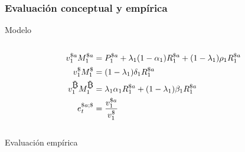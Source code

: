 \begin{frame}[t]
\frametitle{Evaluación conceptual y empírica}
    
    \begin{block}{Modelo}
        \vspace{-10pt}
        \begin{column}{0.4\textwidth}
            \tiny
            \begin{align*}
            v^{\$a}_1 M^{\$a}_1&=P_1^{{\$a}} + \lambda_1 (1-\alpha_1) R_1^{{\$a}} + (1-\lambda_1){\rho_1}  R_1^{{\$a}}\\
            v_1^{\$} M_1^{\$}&=(1-\lambda_1){\delta_1} R_1^{\$a}\\
            v_1^{\bitcoinA} M_1^{\bitcoinA}&={\lambda_1}  \alpha_1 R_1^{\$a} + (1-\lambda_1){\beta_1} R_1^{\$a}\\
            e_t^{{\$a};{\$}}&=\frac{v_1^{\$a}}{v_1^{\$}}
            \end{align*}
        \end{column}
        \begin{column}{0.4\textwidth}
        \end{column}
    \end{block}
    
\begin{block}{Evaluación empírica}
    
    \begin{minipage}[t][.4\textheight][t]{\textwidth}
        

\end{minipage}
\end{block}
\end{frame}
